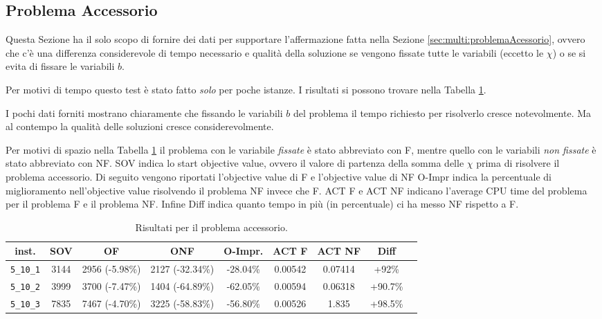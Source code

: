 \subsection{Problema Accessorio}
\label{sec:benchmark:accessorio}
Questa Sezione ha il solo scopo di fornire dei dati per supportare l'affermazione
fatta nella Sezione \ref{sec:multi:problemaAcessorio}, ovvero che c'è una 
differenza  considerevole di tempo necessario e qualità della soluzione se 
vengono fissate 
tutte le variabili (eccetto le $\chi$) o se si evita di fissare le variabili
$b$.

Per motivi di tempo questo test è stato fatto \emph{solo} per poche istanze.
I risultati si possono trovare nella Tabella \ref{table:accessorio:res}.

I pochi dati forniti mostrano chiaramente che fissando le variabili $b$ del problema
il tempo richiesto per risolverlo cresce notevolmente. Ma al contempo la qualità
delle soluzioni cresce considerevolmente.

Per motivi di spazio nella Tabella \ref{table:accessorio:res} il problema con
le variabile \emph{fissate} è stato abbreviato con F, mentre quello con le
variabili \emph{non fissate} è stato abbreviato con NF.
SOV indica lo start objective
value, ovvero il valore di partenza della somma delle $\chi$ prima di risolvere
il problema accessorio.
Di seguito vengono riportati l'objective value di F e l'objective value di NF 
O-Impr indica la percentuale di miglioramento nell'objective value risolvendo
il problema NF invece che F. 
ACT F e ACT NF indicano l'average CPU time del problema per il problema F
e il problema NF. Infine Diff indica quanto tempo
in più (in percentuale) ci ha messo NF rispetto a F.


\begin{table}[h!]
\begin{center}
\small
\begin{tabular}{| c | c | c | c | c | c | c | c | c | }
\hline
inst.			& SOV	& OF				& ONF 				& O-Impr. 	& ACT F 	& ACT NF 		& Diff \\
\hline
\verb|5_10_1|	& 3144  	& 2956	(-5.98\%) 	& 2127 	(-32.34\%)	& -28.04\%	 			& 0.00542 	& 0.07414 	& +92\% \\ 
\verb|5_10_2|	& 3999		& 3700	(-7.47\%)	& 1404	(-64.89\%)	& -62.05\%				& 0.00594	& 0.06318 		& +90.7\%\\
\verb|5_10_3|	& 7835		& 7467	(-4.70\%)	& 3225	(-58.83\%)	& -56.80\%				& 0.00526	& 1.835 		& +98.5\% \\

\hline
\end{tabular}
\caption{Risultati per il problema accessorio.}
\label{table:accessorio:res}
\end{center}
\end{table}
